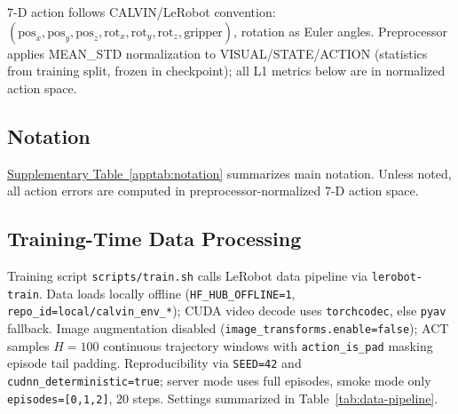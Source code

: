 \documentclass[10pt,twocolumn,letterpaper]{article}
\newcounter{apptab}
\newcommand{\apptabref}[1]{\hyperref[#1]{Supplementary Table~\ref*{#1}}}
\newcommand{\tabref}[1]{Table~\ref{#1}}
\begin{document}
7-D action follows CALVIN/LeRobot convention: $(\mathrm{pos}_x,\mathrm{pos}_y,\mathrm{pos}_z,\mathrm{rot}_x,\mathrm{rot}_y,\mathrm{rot}_z,\mathrm{gripper})$, rotation as Euler angles. Preprocessor applies MEAN\_STD normalization to VISUAL/STATE/ACTION (statistics from training split, frozen in checkpoint); all L1 metrics below are in normalized action space.

\subsection{Notation}

\apptabref{apptab:notation} summarizes main notation. Unless noted, all action errors are computed in preprocessor-normalized 7-D action space.

\subsection{Training-Time Data Processing}

Training script \texttt{scripts/train.sh} calls LeRobot data pipeline via \texttt{lerobot-train}. Data loads locally offline (\texttt{HF\_HUB\_OFFLINE=1}, \texttt{repo\_id=local/calvin\_env\_*}); CUDA video decode uses \texttt{torchcodec}, else \texttt{pyav} fallback. Image augmentation disabled (\texttt{image\_transforms.enable=false}); ACT samples $H{=}100$ continuous trajectory windows with \texttt{action\_is\_pad} masking episode tail padding. Reproducibility via \texttt{SEED=42} and \texttt{cudnn\_deterministic=true}; server mode uses full episodes, smoke mode only \texttt{episodes=[0,1,2]}, 20 steps. Settings summarized in \tabref{tab:data-pipeline}.

\begin{table}[H]
  \centering
  \caption{Training-time data pipeline settings}
  \label{tab:data-pipeline}
  \footnotesize
\end{table}
\end{document}
